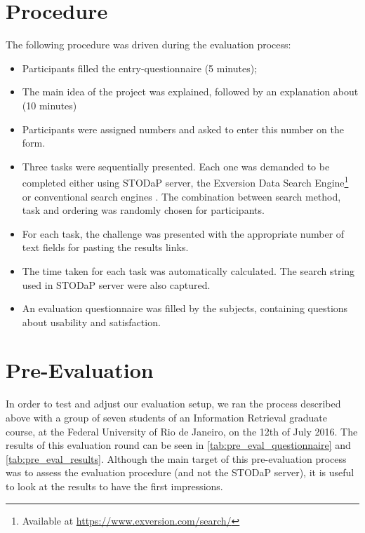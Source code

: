 \section{Procedure}

The following procedure was driven during the evaluation process:

\begin{itemize}
	\item Participants filled the entry-questionnaire (5 minutes);
	\item The main idea of the project was explained, followed by an explanation about (10 minutes)
	\item Participants were assigned numbers and asked to enter this number on the form. 
	\item Three tasks were sequentially presented. 
	Each one was demanded to be completed either using STODaP server, the Exversion Data Search Engine\footnote{Available at \url{https://www.exversion.com/search/}} or conventional search engines \cite{Xu2009}.
	The combination between search method, task and ordering was randomly chosen for participants.
	\item For each task, the challenge was presented with the appropriate number of text fields for pasting the results links.
	\item The time taken for each task was automatically calculated. The search string used in STODaP server were also captured.
	\item An evaluation questionnaire was filled by the subjects, containing questions about usability and satisfaction.
\end{itemize}

\section{Pre-Evaluation}

In order to test and adjust our evaluation setup, we ran the process described above with a group of seven students of an Information Retrieval graduate course, at the Federal University of Rio de Janeiro, on the 12th of July 2016.
The results of this evaluation round can be seen in \autoref{tab:pre_eval_questionnaire} and \autoref{tab:pre_eval_results}.
Although the main target of this pre-evaluation process was to assess the evaluation procedure (and not the STODaP server), it is useful to look at the results to have the first impressions.

